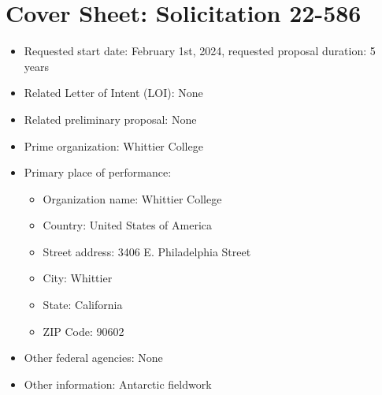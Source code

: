 \documentclass[../../main.tex]{subfiles}
\begin{document}
\section{Cover Sheet: Solicitation 22-586}

\begin{itemize}
\item Requested start date: February 1st, 2024, requested proposal duration: 5 years
\item Related Letter of Intent (LOI): None
\item Related preliminary proposal: None
\item Prime organization: Whittier College
\item Primary place of performance:
\begin{itemize}
\item Organization name: Whittier College
\item Country: United States of America
\item Street address: 3406 E. Philadelphia Street
\item City: Whittier
\item State: California
\item ZIP Code: 90602
\end{itemize}
\item Other federal agencies: None
\item Other information: Antarctic fieldwork
\end{itemize}

\clearpage
\end{document}
